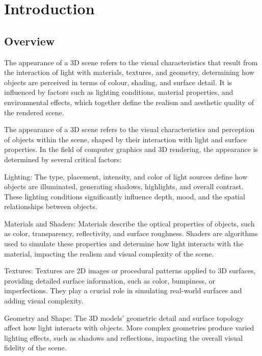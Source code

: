 \chapter{Introduction}






\section{Overview} 

The appearance of a 3D scene refers to the visual characteristics that result from the interaction of light with materials, textures, and geometry, determining how objects are perceived in terms of colour, shading, and surface detail. It is influenced by factors such as lighting conditions, material properties, and environmental effects, which together define the realism and aesthetic quality of the rendered scene.


The appearance of a 3D scene refers to the visual characteristics and perception of objects within the scene, shaped by their interaction with light and surface properties. In the field of computer graphics and 3D rendering, the appearance is determined by several critical factors:

Lighting: The type, placement, intensity, and color of light sources define how objects are illuminated, generating shadows, highlights, and overall contrast. These lighting conditions significantly influence depth, mood, and the spatial relationships between objects.

Materials and Shaders: Materials describe the optical properties of objects, such as color, transparency, reflectivity, and surface roughness. Shaders are algorithms used to simulate these properties and determine how light interacts with the material, impacting the realism and visual complexity of the scene.

Textures: Textures are 2D images or procedural patterns applied to 3D surfaces, providing detailed surface information, such as color, bumpiness, or imperfections. They play a crucial role in simulating real-world surfaces and adding visual complexity.

Geometry and Shape: The 3D models' geometric detail and surface topology affect how light interacts with objects. More complex geometries produce varied lighting effects, such as shadows and reflections, impacting the overall visual fidelity of the scene.

